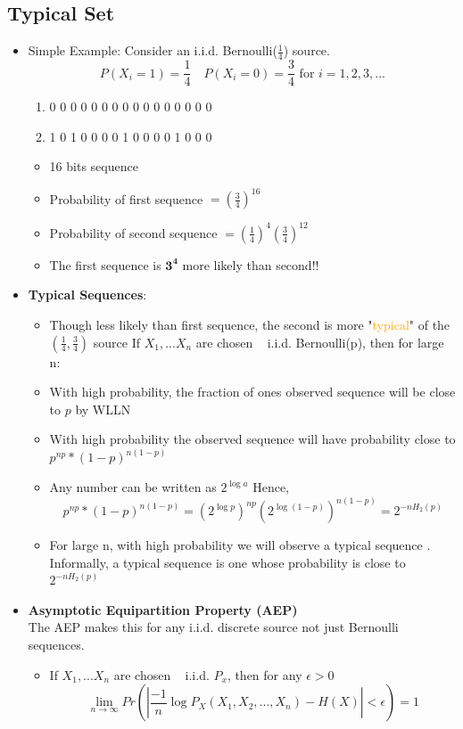 \documentclass[12pt]{article}
\begin{document}
\subsection{Typical Set}
\begin{itemize}
\item Simple Example: Consider an i.i.d. Bernoulli($\frac{1}{4}$) source.
$$P(X_i =1) =\frac{1}{4} \quad P(X_i = 0) = \frac{3}{4} \textrm{ for } i=1,2,3,... $$
\begin{enumerate}
\item  0 0 0 0 0 0 0 0 0 0 0 0 0 0 0 0
\item  1 0 1 0 0 0 0 1 0 0 0 0 1 0 0 0
\end{enumerate}
\begin{itemize}
\item 16 bits sequence 
\item Probability of first sequence $=(\frac{3}{4})^16$
\item Probability of second sequence $=(\frac{1}{4})^4(\frac{3}{4})^12$
\item The first sequence is $\mathbf{3^4}$ more likely than second!!
\end{itemize}

\item \textbf{Typical Sequences}:
\begin{itemize}
\item Though less likely than first sequence, the second is more "\textcolor{orange}{typical}" of the $(\frac{1}{4},\frac{3}{4})$ source
If $X_1,...X_n$ are chosen ~ i.i.d. Bernoulli(p), then for large n:
\item With high probability, the fraction of ones observed sequence will be close to $p$ by WLLN
\item With high probability the observed sequence will have probability close to $p^{np}*(1-p)^{n(1-p)}$
\item Any number can be written as $2^{\log a}$ Hence,
$$p^{np}*(1-p)^{n(1-p)} = (2^{\log p})^{np}(2^{\log (1-p)})^{n(1-p)} = 2^{-nH_2(p)}$$
\item For large n, with high probability we will observe a \textcolor{blue1}{typical sequence }. Informally, a typical sequence is one whose probability is close to $2^{-nH_2(p)}$
\end{itemize}
\item \textbf{Asymptotic Equipartition Property (AEP)}\\
The AEP makes this for any i.i.d. discrete source not just Bernoulli sequences. \\
\begin{itemize}
\item If $X_1,...X_n$ are chosen ~ i.i.d. $P_x$, then for any $\epsilon > 0$
$$\lim_{n \rightarrow \infty} Pr\left(\left| \frac{-1}{n} \log P_X(X_1,X_2,...,X_n) - H(X)\right| < \epsilon \right) = 1$$


\end{itemize}
\end{itemize}
\end{document}
